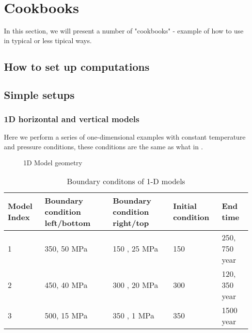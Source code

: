 \section{Cookbooks}
\label{sec:cookbooks}

In this section, we will present a number of "cookbooks" - example of how to use \foam in typical or less tipical ways.


\subsection{How to set up computations}

\subsection{Simple setups}

\subsubsection{1D horizontal and vertical models}
Here we perform a series of one-dimensional examples with constant temperature and pressure conditions, these conditions are the same as what in \cite{weis2014hydrothermal}.

\begin{figure}[!h]
	\centering
	
	\caption{1D Model geometry}
\end{figure}

\begin{table}[htbp]
	\centering
	\begin{threeparttable}
		\caption{Boundary conditons of 1-D models}
		\label{tab:conditions_1Dmodels}
		\begin{tabular}{lllll}
			\toprule
			Model Index & Boundary condition left/bottom & Boundary condition right/top & Initial condition & End time \\
			\midrule
			1 &  350\ssd, 50 MPa & 150 \ssd, 25 MPa & 150 \ssd  & 250, 750 year\\
			2 &  450\ssd, 40 MPa & 300 \ssd, 20 MPa & 300 \ssd  & 120, 350 year\\
			3 &  500\ssd, 15 MPa & 350 \ssd, 1 MPa & 350 \ssd  & 1500 year\\
			\bottomrule
		\end{tabular}
	\end{threeparttable}
\end{table}

